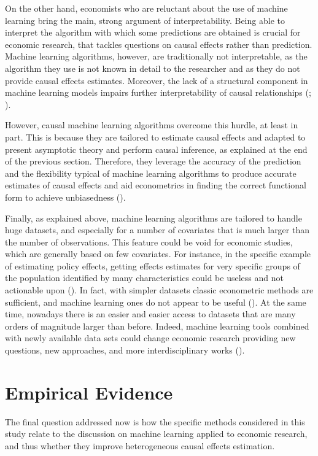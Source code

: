 \documentclass[12pt,a4paper,openright,twoside]{book}
\begin{document}
\begin{doublespacing}
On the other hand, economists who are reluctant about the use of machine learning bring the main, strong argument of interpretability. Being able to interpret the algorithm with which some predictions are obtained is crucial for economic research, that tackles questions on causal effects rather than prediction. Machine learning algorithms, however, are traditionally not interpretable, as the algorithm they use is not known in detail to the researcher and as they do not provide causal effects estimates. Moreover, the lack of a structural component in machine learning models impairs further interpretability of causal relationships (\citealp{heckmanpinto2022}; \citealp{videoimbangr}). 

However, causal machine learning algorithms overcome this hurdle, at least in part. This is because they are tailored to estimate causal effects and adapted to present asymptotic theory and perform causal inference, as explained at the end of the previous section. Therefore, they leverage the accuracy of the prediction and the flexibility typical of machine learning algorithms to produce accurate estimates of causal effects and aid econometrics in finding the correct functional form to achieve unbiasedness (\citealp{athey2019}). 

Finally, as explained above, machine learning algorithms are tailored to handle huge datasets, and especially for a number of covariates that is much larger than the number of observations. This feature could be void for economic studies, which are generally based on few covariates. For instance, in the specific example of estimating policy effects, getting effects estimates for very specific groups of the population identified by many characteristics could be useless and not actionable upon (\citealp{videoimbangr}). In fact, with simpler datasets classic econometric methods are sufficient, and machine learning ones do not appear to be useful (\citealp{bankarticle}). At the same time, nowadays there is an easier and easier access to datasets that are many orders of magnitude larger than before. Indeed, machine learning tools combined with newly available data sets could change economic research providing new questions, new
approaches, and more interdisciplinary works (\citealp{athey2019}). 

\section{Empirical Evidence} \label{disc} 
The final question addressed now is how the specific methods considered in this study relate to the discussion on machine learning applied to economic research, and thus whether they improve heterogeneous causal effects estimation. \\


\end{doublespacing}
\end{document}
